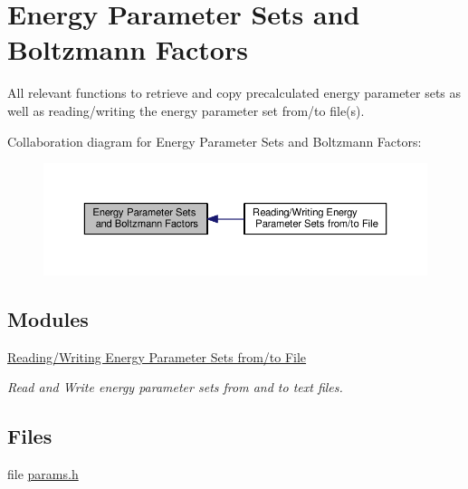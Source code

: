 \hypertarget{group__energy__parameters}{\section{Energy Parameter Sets and Boltzmann Factors}
\label{group__energy__parameters}
}


All relevant functions to retrieve and copy precalculated energy parameter sets as well as reading/writing the energy parameter set from/to file(s).  


Collaboration diagram for Energy Parameter Sets and Boltzmann Factors\-:
\nopagebreak
\begin{figure}[H]
\begin{center}
\leavevmode
\includegraphics[width=350pt]{group__energy__parameters}
\end{center}
\end{figure}
\subsection*{Modules}
\begin{DoxyCompactItemize}
\item 
\hyperlink{group__energy__parameters__rw}{Reading/\-Writing Energy Parameter Sets from/to File}
\begin{DoxyCompactList}\small\item\em Read and Write energy parameter sets from and to text files. \end{DoxyCompactList}\end{DoxyCompactItemize}
\subsection*{Files}
\begin{DoxyCompactItemize}
\item 
file \hyperlink{params_8h}{params.\-h}
\end{DoxyCompactItemize}
